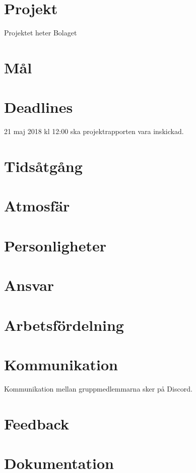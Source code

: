
\section*{Projekt}
Projektet heter Bolaget

\section*{Mål}


\section*{Deadlines}

21 maj 2018 kl 12:00 ska projektrapporten vara inskickad.

\section*{Tidsåtgång}


\section*{Atmosfär}

\section*{Personligheter}


\section*{Ansvar}

\section*{Arbetsfördelning}

\section*{Kommunikation}

Kommunikation mellan gruppmedlemmarna sker på Discord.

\section*{Feedback}

\section*{Dokumentation}

